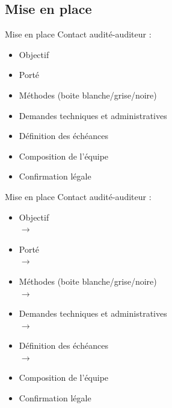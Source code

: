 \documentclass{beamer}
\newcommand{\colorized}[1]{{\color{red}{#1}}}
\begin{document}
\subsection{Mise en place}
\begin{frame}{Mise en place}
	Contact audité-auditeur : 
	\begin{itemize}
		\item Objectif
		\item Porté 
		\item Méthodes (boite blanche/grise/noire) 
		\item Demandes techniques et administratives 
		\item Définition des échéances 
		\item Composition de l'équipe 
		\item Confirmation légale 
	\end{itemize}		
\end{frame}
\begin{frame}{Mise en place}
	Contact audité-auditeur : 
	\begin{itemize}
		\item Objectif \\
		      $\rightarrow$ \colorized{vérifier des vulnérabilités de l'OWASP TOP 10}
		\item Porté \\
		      $\rightarrow$ \colorized{application web (en local)}
		\item Méthodes (boite blanche/grise/noire) \\
		      $\rightarrow$ \colorized{boite blanche}
		\item Demandes techniques et administratives \\
		      $\rightarrow$ \colorized{code source}
		\item Définition des échéances \\
		      $\rightarrow$ \colorized{\today}
		\item Composition de l'équipe 
		\item Confirmation légale 
	\end{itemize}		
\end{frame}
\end{document}
